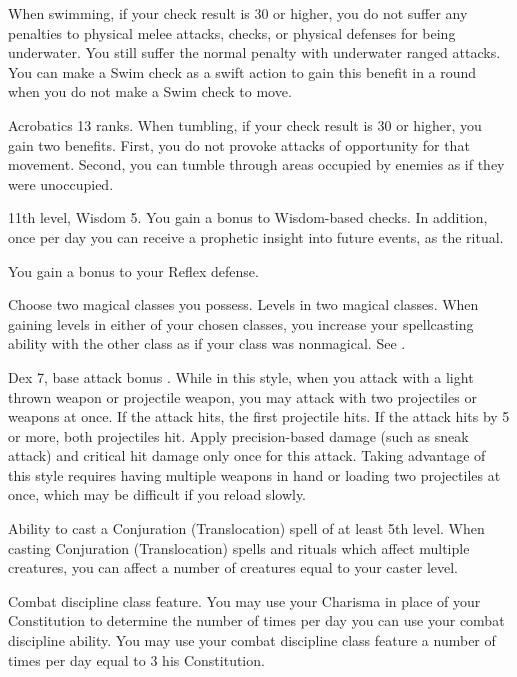 When swimming, if your check result is 30 or higher, you do not suffer any penalties to physical melee attacks, checks, or physical defenses for being underwater. You still suffer the normal penalty with underwater ranged attacks. You can make a Swim check as a swift action to gain this benefit in a round when you do not make a Swim check to move.

\featpre Acrobatics 13 ranks.
\featben When tumbling, if your check result is 30 or higher, you gain two benefits. First, you do not provoke attacks of opportunity for that movement. Second, you can tumble through areas occupied by enemies as if they were unoccupied.

\featpre 11th level, Wisdom 5.
\featben You gain a  bonus to Wisdom-based checks. In addition, once per day you can receive a prophetic insight into future events, as the  ritual.

 You gain a  bonus to your Reflex defense.

Choose two magical classes you possess.
 Levels in two magical classes.
 When gaining levels in either of your chosen classes, you increase your spellcasting ability with the other class as if your class was nonmagical. See .

 Dex 7, base attack bonus .
 While in this style, when you attack with a light thrown weapon or projectile weapon, you may attack with two projectiles or weapons at once. If the attack hits, the first projectile hits. If the attack hits by 5 or more, both projectiles hit. Apply precision-based damage (such as sneak attack) and critical hit damage only once for this attack. Taking advantage of this style requires having multiple weapons in hand or loading two projectiles at once, which may be difficult if you reload slowly.

\featpre Ability to cast a Conjuration (Translocation) spell of at least 5th level.
\featben When casting Conjuration (Translocation) spells and rituals which affect multiple creatures, you can affect a number of creatures equal to your caster level.

\featpre Combat discipline class feature.
\featben You may use your Charisma in place of your Constitution to determine the number of times per day you can use your combat discipline ability.
 You may use your combat discipline class feature a number of times per day equal to 3 \add his Constitution.

